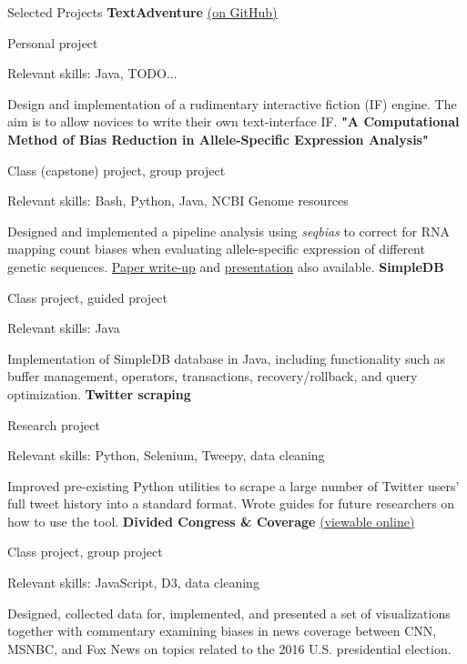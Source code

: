 \begin{rubric}{Selected Projects}
\entry*[2019] %
	\textbf{TextAdventure} \href{https://github.com/cephcyn/TextAdventure}{(on GitHub)}
	\par Personal project
	\par Relevant skills: Java, TODO...
	\par Design and implementation of a rudimentary interactive fiction (IF) engine. The aim is to allow novices to write their own text-interface IF.
\entry*[2019] %
	\textbf{"A Computational Method of Bias Reduction in Allele-Specific Expression Analysis"} %
	\par Class (capstone) project, group project
	\par Relevant skills: Bash, Python, Java, NCBI Genome resources
	\par Designed and implemented a pipeline analysis using \textit{seqbias} to correct for RNA mapping count biases when evaluating allele-specific expression of different genetic sequences. \href{https://github.com/cephcyn/cephcyn.github.io/raw/master/documents/u_cse428/ASE_Report.pdf}{Paper write-up} and \href{https://github.com/cephcyn/cephcyn.github.io/raw/master/documents/u_cse428/ASE_Presentation.pptx}{presentation} also available.
\entry*[2019] %
	\textbf{SimpleDB} %
	\par Class project, guided project
	\par Relevant skills: Java
	\par Implementation of SimpleDB database in Java, including functionality such as buffer management, operators, transactions, recovery/rollback, and query optimization.
\entry*[2018] %
	\textbf{Twitter scraping} %
	\par Research project
	\par Relevant skills: Python, Selenium, Tweepy, data cleaning
	\par Improved pre-existing Python utilities to scrape a large number of Twitter users' full tweet history into a standard format. Wrote guides for future researchers on how to use the tool.
\entry*[2018] %
	\textbf{Divided Congress \& Coverage} \href{https://cse442-18f.github.io/fp-divided-congress-and-coverage/}{(viewable online)} %
	\par Class project, group project
	\par Relevant skills: JavaScript, D3, data cleaning
	\par Designed, collected data for, implemented, and presented a set of visualizations together with commentary examining biases in news coverage between CNN, MSNBC, and Fox News on topics related to the 2016 U.S. presidential election.

\end{rubric}
